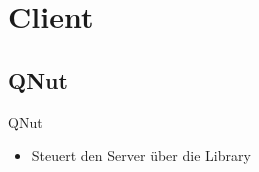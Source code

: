 
\section{Client}
\subsection{QNut}
\begin{frame}[<+-| alert@+>]{QNut}
	\begin{itemize}
		\item Steuert den Server über die Library
	\end{itemize}
\end{frame}
